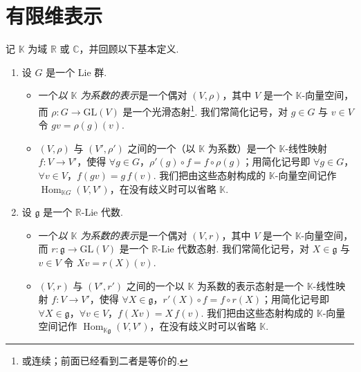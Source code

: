 \section{有限维表示}\label{sec:lie-1-12}

\begin{numpara}[表示的范畴]\label{np:lie-1-12-1}
记 $\mathbb K$ 为域 $\mathbb R$ 或 $\mathbb C$，并回顾以下基本定义.
\begin{enumerate}[label=\roman*)]
\item 设 $G$ 是一个 Lie 群.
\begin{itemize}[label=--]
\item 一个\emph{以 $\mathbb K$ 为系数的表示}是一个偶对 $(V,\rho)$，其中 $V$ 是一个 $\mathbb K$-向量空间，而 $\rho:G\longrightarrow\mathrm{GL}(V)$ 是一个光滑态射\footnote{或连续；前面已经看到二者是等价的.}. 我们常简化记号，对 $g\in G$ 与 $v\in V$ 令 $gv=\rho(g)(v)$.
\item $(V,\rho)$ 与 $(V',\rho')$ 之间的一个（以 $\mathbb K$ 为系数）是一个 $\mathbb K$-线性映射 $f:V\longrightarrow V'$，使得 $\forall g\in G$，$\rho'(g)\circ f=f\circ\rho(g)$；用简化记号即 $\forall g\in G$，$\forall v\in V$，$f(gv)=g\,f(v)$. 我们把由这些态射构成的 $\mathbb K$-向量空间记作 $\operatorname{Hom}_{\mathbb K G}(V,V')$，在没有歧义时可以省略 $\mathbb K$.
\end{itemize}
\item 设 $\mathfrak g$ 是一个 $\mathbb R$-Lie 代数.
\begin{itemize}[label=--]
\item 一个\emph{以 $\mathbb K$ 为系数的表示}是一个偶对 $(V,r)$，其中 $V$ 是一个 $\mathbb K$-向量空间，而 $r:\mathfrak g\longrightarrow\mathrm{GL}(V)$ 是一个 $\mathbb R$-Lie 代数态射. 我们常简化记号，对 $X\in\mathfrak g$ 与 $v\in V$ 令 $Xv=r(X)(v)$.
\item $(V,r)$ 与 $(V',r')$ 之间的一个以 $\mathbb K$ 为系数的表示态射是一个 $\mathbb K$-线性映射 $f:V\longrightarrow V'$，使得 $\forall X\in\mathfrak g$，$r'(X)\circ f=f\circ r(X)$；用简化记号即 $\forall X\in\mathfrak g$，$\forall v\in V$，$f(Xv)=X\,f(v)$. 我们把由这些态射构成的 $\mathbb K$-向量空间记作 $\operatorname{Hom}_{\mathbb K\mathfrak g}(V,V')$，在没有歧义时可以省略 $\mathbb K$.
\end{itemize}
\end{enumerate}
\end{numpara}
